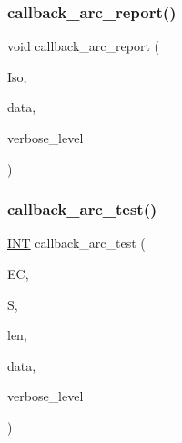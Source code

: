 \mbox{\label{arc__generator_8_c_abf642e61d2743877394bdef7b97d031c}} 
\subsubsection{\texorpdfstring{callback\+\_\+arc\+\_\+report()}{callback\_arc\_report()}}
{\footnotesize\ttfamily void callback\+\_\+arc\+\_\+report (\begin{DoxyParamCaption}\item[{\mbox{\hyperlink{classisomorph}{isomorph}} $\ast$}]{Iso,  }\item[{void $\ast$}]{data,  }\item[{\mbox{\hyperlink{galois_8h_a09fddde158a3a20bd2dcadb609de11dc}{I\+NT}}}]{verbose\+\_\+level }\end{DoxyParamCaption})}

\mbox{\label{arc__generator_8_c_ac540f3bc6459db7353c7b5c911c0694f}} 
\subsubsection{\texorpdfstring{callback\+\_\+arc\+\_\+test()}{callback\_arc\_test()}}
{\footnotesize\ttfamily \mbox{\hyperlink{galois_8h_a09fddde158a3a20bd2dcadb609de11dc}{I\+NT}} callback\+\_\+arc\+\_\+test (\begin{DoxyParamCaption}\item[{\mbox{\hyperlink{classexact__cover}{exact\+\_\+cover}} $\ast$}]{EC,  }\item[{\mbox{\hyperlink{galois_8h_a09fddde158a3a20bd2dcadb609de11dc}{I\+NT}} $\ast$}]{S,  }\item[{\mbox{\hyperlink{galois_8h_a09fddde158a3a20bd2dcadb609de11dc}{I\+NT}}}]{len,  }\item[{void $\ast$}]{data,  }\item[{\mbox{\hyperlink{galois_8h_a09fddde158a3a20bd2dcadb609de11dc}{I\+NT}}}]{verbose\+\_\+level }\end{DoxyParamCaption})}

